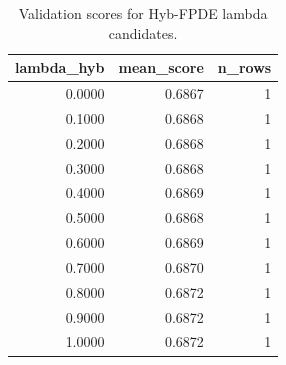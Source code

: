 \begin{table}[t]
\caption{Validation scores for Hyb-FPDE lambda candidates.}
\label{tab:lambda_distribution_computed}
\centering
\begin{tabular}{rrr}
\toprule
lambda\_hyb & mean\_score & n\_rows \\
\midrule
0.0000 & 0.6867 & 1 \\
0.1000 & 0.6868 & 1 \\
0.2000 & 0.6868 & 1 \\
0.3000 & 0.6868 & 1 \\
0.4000 & 0.6869 & 1 \\
0.5000 & 0.6868 & 1 \\
0.6000 & 0.6869 & 1 \\
0.7000 & 0.6870 & 1 \\
0.8000 & 0.6872 & 1 \\
0.9000 & 0.6872 & 1 \\
1.0000 & 0.6872 & 1 \\
\bottomrule
\end{tabular}

\end{table}
